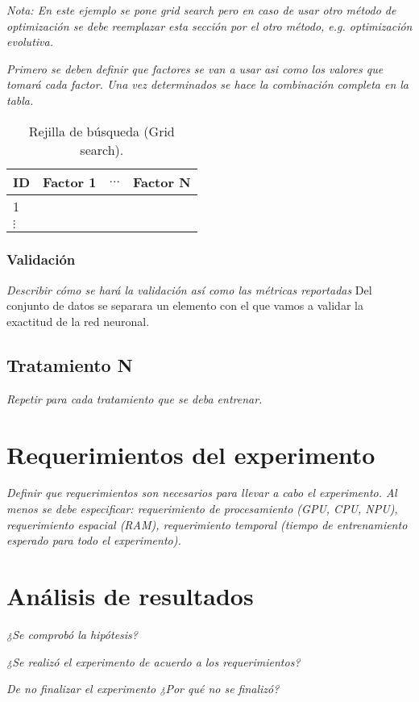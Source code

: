 \documentclass[12pt,twoside,letterpaper]{article}
\begin{document}
\emph{Nota: En este ejemplo se pone grid search pero en caso de usar otro método de optimización se debe reemplazar esta sección por el otro método, e.g. optimización evolutiva.}

\emph{Primero se deben definir que factores se van a usar asi como los valores que tomará cada factor. Una vez determinados se hace la combinación completa en la tabla.}

\begin{table}[h]
\centering
\begin{tabular}{|l|l|l|l|}
\hline
ID                    & Factor 1 & $\dots$ & Factor N \\ \hline
1                     &          &                      &           \\ \hline
$\vdots$ &          &                      &               \\ \hline
\end{tabular}
\caption{Rejilla de búsqueda (Grid search).}
\end{table}

\subsubsection{Validación}

\emph{Describir cómo se hará la validación así como las métricas reportadas}
Del conjunto de datos se separara un elemento con el que vamos a validar la exactitud de la red neuronal.


\subsection{Tratamiento N}

\emph{Repetir para cada tratamiento que se deba entrenar.}

\section{Requerimientos del experimento}

\emph{Definir que requerimientos son necesarios para llevar a cabo el experimento. Al menos se debe especificar: requerimiento de procesamiento (GPU, CPU, NPU), requerimiento espacial (RAM), requerimiento temporal (tiempo de entrenamiento esperado para todo el experimento).}


\section{Análisis de resultados}

\emph{¿Se comprobó la hipótesis?}

\emph{¿Se realizó el experimento de acuerdo a los requerimientos?}

\emph{De no finalizar el experimento ¿Por qué no se finalizó?}



\newpage

\end{document}
